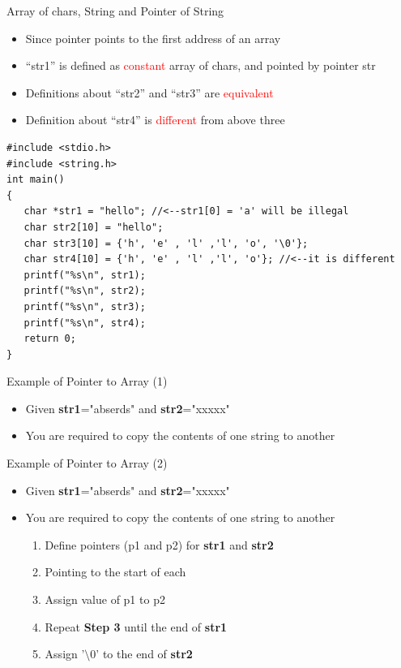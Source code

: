 \begin{frame}[fragile]{Array of chars, String and Pointer of String}
\vspace{-0.2in}
\begin{itemize}
	\item {Since pointer points to the first address of an array}
	\item {``str1'' is defined as \textcolor{red}{constant} array of chars, and pointed by pointer str}
	\item {Definitions about ``str2'' and ``str3'' are \textcolor{red}{equivalent}}
	\item {Definition about ``str4'' is \textcolor{red}{different} from above three}
\end{itemize}
\begin{lstlisting}[xleftmargin=0.02\linewidth, linewidth=0.98\linewidth]
#include <stdio.h>
#include <string.h>
int main()
{
   char *str1 = "hello"; //<--str1[0] = 'a' will be illegal
   char str2[10] = "hello";
   char str3[10] = {'h', 'e' , 'l' ,'l', 'o', '\0'};
   char str4[10] = {'h', 'e' , 'l' ,'l', 'o'}; //<--it is different
   printf("%s\n", str1);
   printf("%s\n", str2);
   printf("%s\n", str3);
   printf("%s\n", str4);
   return 0;
}
\end{lstlisting}
\end{frame}

\begin{frame}[fragile]{Example of Pointer to Array (1)}
\begin{itemize}
	\item {Given \textbf{str1}="abserds" and \textbf{str2}="xxxxx"}
	\item {You are required to copy the contents of one string to another}
\end{itemize}
\end{frame}

\begin{frame}[fragile]{Example of Pointer to Array (2)}
\begin{itemize}
	\item {Given \textbf{str1}="abserds" and \textbf{str2}="xxxxx"}
	\item {You are required to copy the contents of one string to another}
	\begin{enumerate}
		\item {Define pointers (p1 and p2) for \textbf{str1} and \textbf{str2}}
		\item {Pointing to the start of each}
		\item {Assign value of p1 to p2}
		\item {Repeat \textbf{Step 3} until the end of \textbf{str1}}
		\item {Assign '$\setminus0$' to the end of \textbf{str2}}
	\end{enumerate}
\end{itemize}
\end{frame}

